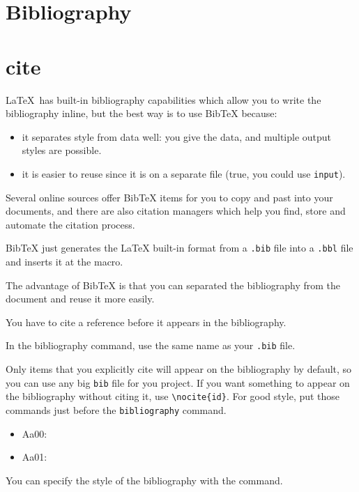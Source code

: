 \documentclass[12pt]{article}
\begin{document}
\section{Bibliography}

\section{cite}\label{cite}

\LaTeX\ has built-in bibliography capabilities which allow you to write the bibliography inline, but the best way is to use BibTeX because:

\begin{itemize}
\item it separates style from data well: you give the data, and multiple output styles are possible.
\item it is easier to reuse since it is on a separate file (true, you could use \lstinline|input|).
\end{itemize}

Several online sources offer BibTeX items for you to copy and past into your documents, and there are also citation managers which help you find, store and automate the citation process.

BibTeX just generates the LaTeX built-in format from a \lstinline|.bib| file into a \lstinline|.bbl| file and inserts it at the \lstinline|| macro.

The advantage of BibTeX is that you can separated the bibliography from the document and reuse it more easily.

You have to cite a reference before it appears in the bibliography.

In the bibliography command, use the same name as your \lstinline|.bib| file.

Only items that you explicitly cite will appear on the bibliography by default, so you can use any big \lstinline|bib| file for you project. If you want something to appear on the bibliography without citing it, use \lstinline|\nocite{id}|. For good style, put those commands just before the \lstinline|bibliography| command.

\begin{itemize}
\item Aa00: \cite{Aa00}
\item Aa01: \cite{Aa01}
\end{itemize}

You can specify the style of the bibliography with the \lstinline||  command.
\end{document}
